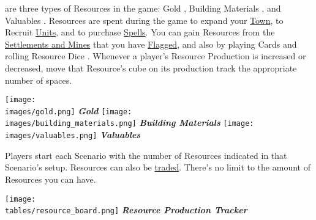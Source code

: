 
\begin{multicols}{2}

 are three types of Resources in the game: Gold , Building Materials , and Valuables .
Resources are spent during the game to expand your \hyperlink{Town}{Town}, to Recruit \hyperlink{Units}{Units}, and to purchase \hyperlink{spells}{Spells}.
You can gain Resources from the \hyperlink{Mines}{Settlements and Mines} that you have \hyperlink{Categories}{Flagged}, and also by playing Cards and rolling Resource Dice .
Whenever a player's Resource Production is increased or decreased, move that Resource's cube on its production track the appropriate number of spaces.\par
\begin{multicols}{3}
  \centering
  \vspace*{\fill}
  \texttt{[image: \\images/gold.png]}
  \footnotesize\textcolor{darkcandyapplered}{\textit{\textbf{Gold \phantom{Materials}}}}
  \columnbreak
  \vspace*{\fill}
  \texttt{[image: \\images/building\_materials.png]}
  \footnotesize\textcolor{darkcandyapplered}{\textit{\textbf{Building Materials}}}
  \columnbreak
  \vspace*{\fill}
  \texttt{[image: \\images/valuables.png]}
  \footnotesize\textcolor{darkcandyapplered}{\textit{\textbf{Valuables \phantom{Materials}}}}
\end{multicols}
Players start each Scenario with the number of Resources indicated in that Scenario’s setup.
Resources can also be \hyperlink{Trading}{traded}.
There's no limit to the amount of Resources you can have.

\vspace*{\fill}

\columnbreak

\texttt{[image: \\tables/resource\_board.png]}
\smallskip
\centering\footnotesize\textcolor{darkcandyapplered}{\textbf{\textit{Resource Production Tracker}}}
\bigskip


\end{multicols}
